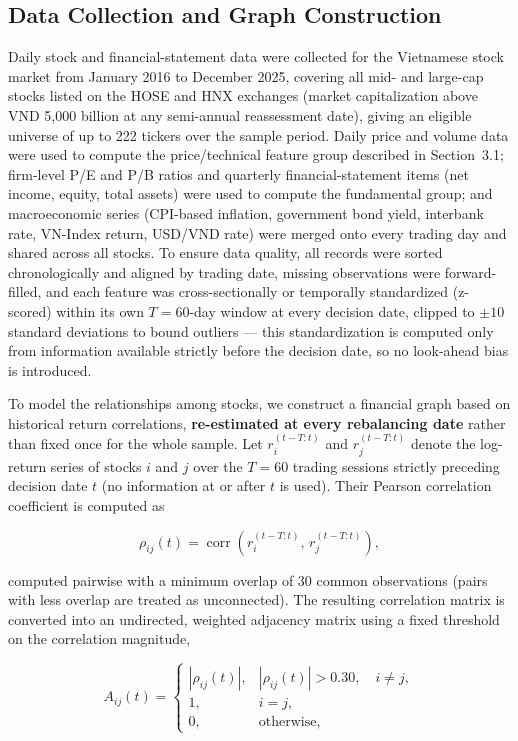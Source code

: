 \documentclass[runningheads]{llncs}
\begin{document}
\subsection{Data Collection and Graph Construction}

Daily stock and financial-statement data were collected for the Vietnamese stock market from January 2016 to December 2025, covering all mid- and large-cap stocks listed on the HOSE and HNX exchanges (market capitalization above VND 5{,}000 billion at any semi-annual reassessment date), giving an eligible universe of up to 222 tickers over the sample period. Daily price and volume data were used to compute the price/technical feature group described in Section~3.1; firm-level P/E and P/B ratios and quarterly financial-statement items (net income, equity, total assets) were used to compute the fundamental group; and macroeconomic series (CPI-based inflation, government bond yield, interbank rate, VN-Index return, USD/VND rate) were merged onto every trading day and shared across all stocks. To ensure data quality, all records were sorted chronologically and aligned by trading date, missing observations were forward-filled, and each feature was cross-sectionally or temporally standardized (z-scored) within its own $T=60$-day window at every decision date, clipped to $\pm 10$ standard deviations to bound outliers --- this standardization is computed only from information available strictly before the decision date, so no look-ahead bias is introduced.

To model the relationships among stocks, we construct a financial graph based on historical return correlations, \textbf{re-estimated at every rebalancing date} rather than fixed once for the whole sample. Let $r_i^{(t-T:t)}$ and $r_j^{(t-T:t)}$ denote the log-return series of stocks $i$ and $j$ over the $T=60$ trading sessions strictly preceding decision date $t$ (no information at or after $t$ is used). Their Pearson correlation coefficient is computed as

\[
\rho_{ij}(t)
=
\operatorname{corr}\!\left(r_i^{(t-T:t)},\, r_j^{(t-T:t)}\right),
\]

computed pairwise with a minimum overlap of 30 common observations (pairs with less overlap are treated as unconnected). The resulting correlation matrix is converted into an undirected, weighted adjacency matrix using a fixed threshold on the correlation magnitude,

\[
A_{ij}(t)
=
\begin{cases}
|\rho_{ij}(t)|,
&
|\rho_{ij}(t)|>0.30,\quad i\neq j,\\
1, & i=j,\\
0,
&
\text{otherwise},
\end{cases}
\]
\end{document}
